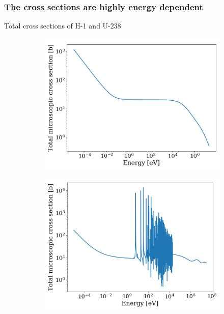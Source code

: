 \documentclass[fleqn]{beamer}
\begin{document}
    \begin{frame}
        \frametitle{The cross sections are highly energy dependent}
        \centering
        Total cross sections of H-1 and U-238
        \begin{figure}[htb]
            \begin{subfigure}{0.5\textwidth}
                \centering
                \includegraphics[totalheight=0.45\textheight]{figures/h1}
                \label{fig:XS_H1}
            \end{subfigure}%
            \begin{subfigure}{0.5\textwidth}
                \centering
                \includegraphics[totalheight=0.45\textheight]{figures/u238}
                \label{fig:XS_U238}
            \end{subfigure}%
        \end{figure}
    \end{frame}
\end{document}

